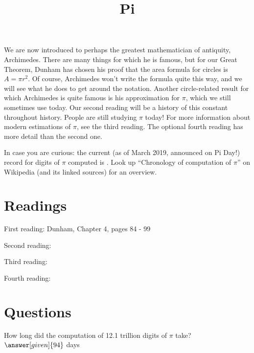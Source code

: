 \documentclass[nooutcomes]{ximera}
\title{Pi}
\begin{document}
\begin{abstract}
    
\end{abstract}
\maketitle

We are now introduced to perhaps the greatest mathematician of antiquity, Archimedes.  There are many things for which he is famous, but for our Great Theorem, Dunham has chosen his proof that the area formula for circles is $A = \pi r^2$.  Of course, Archimedes won't write the formula quite this way, and we will see what he does to get around the notation.  Another circle-related result for which Archimedes is quite famous is his approximation for $\pi$, which we still sometimes use today.  Our second reading will be a history of this constant throughout history.  People are still studying $\pi$ today!  For more information about modern estimations of $\pi$, see the third reading.  The optional fourth reading has more detail than the second one.

In case you are curious: the current (as of March 2019, announced on Pi Day!) record for digits of $\pi$ computed is .  Look up ``Chronology of computation of $\pi$'' on Wikipedia (and its linked sources) for an overview.


\section{Readings}
First reading: Dunham, Chapter 4, pages 84 - 99

Second reading: 

Third reading: 

Fourth reading: 

\section{Questions}

\begin{question}
How long did the computation of 12.1 trillion digits of $\pi$ take? $\answer[given]{94}$ days
\end{question}
\end{document}
